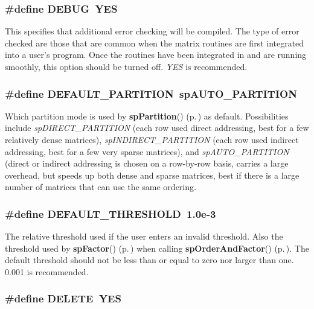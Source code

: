 \subsubsection{\setlength{\rightskip}{0pt plus 5cm}\#define DEBUG\ YES}\label{spConfig_8h_a20}


This specifies that additional error checking will be compiled. The type of error checked are those that are common when the matrix routines are first integrated into a user's program. Once the routines have been integrated in and are running smoothly, this option should be turned off. {\em YES} is recommended. 
\subsubsection{\setlength{\rightskip}{0pt plus 5cm}\#define DEFAULT\_\-PARTITION\ sp\-AUTO\_\-PARTITION}\label{spConfig_8h_a32}


Which partition mode is used by {\bf sp\-Partition}() {\rm (p.\,\pageref{spFactor_8c_a26})} as default. Possibilities include {\em sp\-DIRECT\_\-PARTITION} (each row used direct addressing, best for a few relatively dense matrices), {\em sp\-INDIRECT\_\-PARTITION} (each row used indirect addressing, best for a few very sparse matrices), and {\em sp\-AUTO\_\-PARTITION} (direct or indirect addressing is chosen on a row-by-row basis, carries a large overhead, but speeds up both dense and sparse matrices, best if there is a large number of matrices that can use the same ordering. 
\subsubsection{\setlength{\rightskip}{0pt plus 5cm}\#define DEFAULT\_\-THRESHOLD\ 1.0e-3}\label{spConfig_8h_a23}


The relative threshold used if the user enters an invalid threshold. Also the threshold used by {\bf sp\-Factor}() {\rm (p.\,\pageref{spFactor_8c_a25})} when calling {\bf sp\-Order\-And\-Factor}() {\rm (p.\,\pageref{spFactor_8c_a24})}. The default threshold should not be less than or equal to zero nor larger than one. 0.001 is recommended. 
\subsubsection{\setlength{\rightskip}{0pt plus 5cm}\#define DELETE\ YES}\label{spConfig_8h_a7}


